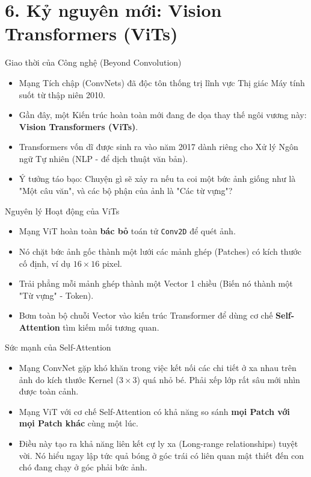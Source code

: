 \documentclass[aspectratio=169]{beamer}
\begin{document}
\section{6. Kỷ nguyên mới: Vision Transformers (ViTs)}

\begin{frame}{Giao thời của Công nghệ (Beyond Convolution)}
    \begin{itemize}
        \item Mạng Tích chập (ConvNets) đã độc tôn thống trị lĩnh vực Thị giác Máy tính suốt từ thập niên 2010.
        \item Gần đây, một Kiến trúc hoàn toàn mới đang đe dọa thay thế ngôi vương này: \textbf{Vision Transformers (ViTs)}.
        \item Transformers vốn dĩ được sinh ra vào năm 2017 dành riêng cho Xử lý Ngôn ngữ Tự nhiên (NLP - để dịch thuật văn bản).
        \item Ý tưởng táo bạo: Chuyện gì sẽ xảy ra nếu ta coi một bức ảnh giống như là "Một câu văn", và các bộ phận của ảnh là "Các từ vựng"?
    \end{itemize}
\end{frame}

\begin{frame}{Nguyên lý Hoạt động của ViTs}
    \begin{itemize}
        \item Mạng ViT hoàn toàn \textbf{bác bỏ} toán tử \texttt{Conv2D} để quét ảnh.
        \item Nó chặt bức ảnh gốc thành một lưới các mảnh ghép (Patches) có kích thước cố định, ví dụ $16 \times 16$ pixel.
        \item Trải phẳng mỗi mảnh ghép thành một Vector 1 chiều (Biến nó thành một "Từ vựng" - Token).
        \item Bơm toàn bộ chuỗi Vector vào kiến trúc Transformer để dùng cơ chế \textbf{Self-Attention} tìm kiếm mối tương quan.
    \end{itemize}
\end{frame}

\begin{frame}{Sức mạnh của Self-Attention}
    \begin{itemize}
        \item Mạng ConvNet gặp khó khăn trong việc kết nối các chi tiết ở xa nhau trên ảnh do kích thước Kernel ($3 \times 3$) quá nhỏ bé. Phải xếp lớp rất sâu mới nhìn được toàn cảnh.
        \item Mạng ViT với cơ chế Self-Attention có khả năng so sánh \textbf{mọi Patch với mọi Patch khác} cùng một lúc.
        \item Điều này tạo ra khả năng liên kết cự ly xa (Long-range relationships) tuyệt vời. Nó hiểu ngay lập tức quả bóng ở góc trái có liên quan mật thiết đến con chó đang chạy ở góc phải bức ảnh.
    \end{itemize}
\end{frame}
\end{document}
